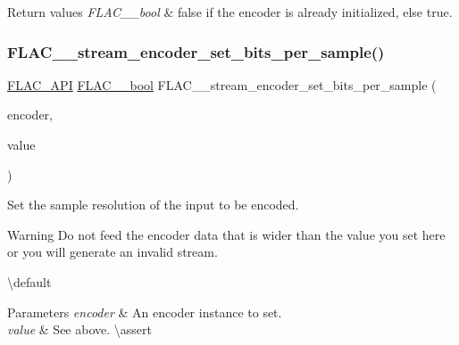 \begin{DoxyRetVals}{Return values}
{\em F\+L\+A\+C\+\_\+\+\_\+bool} & {\ttfamily false} if the encoder is already initialized, else {\ttfamily true}. \\
\hline
\end{DoxyRetVals}
\mbox{\label{group__flac__stream__encoder_ga5a21cf7f86a81df6ba72714a6b917aa3}} 
\subsubsection{\texorpdfstring{FLAC\_\_stream\_encoder\_set\_bits\_per\_sample()}{FLAC\_\_stream\_encoder\_set\_bits\_per\_sample()}}
{\footnotesize\ttfamily \mbox{\hyperlink{group__flac__export_ga56ca07df8a23310707732b1c0007d6f5}{F\+L\+A\+C\+\_\+\+A\+PI}} \mbox{\hyperlink{ordinals_8h_a95103469f1cbd78b8cf250194985b34e}{F\+L\+A\+C\+\_\+\+\_\+bool}} F\+L\+A\+C\+\_\+\+\_\+stream\+\_\+encoder\+\_\+set\+\_\+bits\+\_\+per\+\_\+sample (\begin{DoxyParamCaption}\item[{\mbox{\hyperlink{struct_f_l_a_c_____stream_encoder}{F\+L\+A\+C\+\_\+\+\_\+\+Stream\+Encoder}} $\ast$}]{encoder,  }\item[{unsigned}]{value }\end{DoxyParamCaption})}

Set the sample resolution of the input to be encoded.

\begin{DoxyWarning}{Warning}
Do not feed the encoder data that is wider than the value you set here or you will generate an invalid stream.
\end{DoxyWarning}
\textbackslash{}default {} 
\begin{DoxyParams}{Parameters}
{\em encoder} & An encoder instance to set. \\
\hline
{\em value} & See above. \textbackslash{}assert 
\begin{DoxyCode}{1}
\end{DoxyCode}
 \\
\hline
\end{DoxyParams}

